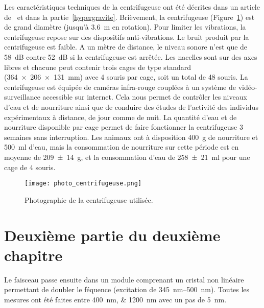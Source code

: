 			Les caractéristiques techniques de la centrifugeuse ont été décrites dans un article de~\cite{jamon_ground-based_2008} et dans la partie~\ref{hypergravite}. Brièvement, la centrifugeuse (Figure~\ref{photo_centrifugeuse}) est de grand diamètre (jusqu'à \SI{3.6}{\m} en rotation). Pour limiter les vibrations, la centrifugeuse repose sur des dispositifs anti-vibrations. Le bruit produit par la centrifugeuse est faible. A un mètre de distance, le niveau sonore n'est que de \SI{58}{\dB} contre \SI{52}{\dB} si la centrifugeuse est arrêtée. Les nacelles sont sur des axes libres et chacune peut contenir trois cages de type standard (\SI{364x206x131}{\mm}) avec 4 souris par cage, soit un total de 48 souris. La centrifugeuse est équipée de caméras infra-rouge couplées à un système de vidéo-surveillance accessible sur internet. Cela nous permet de contrôler les niveaux d'eau et de nourriture ainsi que de conduire des études de l'activité des individus expérimentaux à distance, de jour comme de nuit. La quantité d'eau et de nourriture disponible par cage permet de faire fonctionner la centrifugeuse 3 semaines sans interruption. Les animaux ont à disposition \SI{400}{\g} de nourriture et \SI{500}{\ml} d'eau, mais la consommation de nourriture sur cette période est en moyenne de \SI{209(14)}{\g}, et la consommation d'eau de \SI{258(21)}{\ml} pour une cage de 4 souris.

			\begin{figure}[h!tbp]
				\vspace{0.5cm}
				\setcapindent{2em}
				\centering
				\texttt{[image: photo\_centrifugeuse.png]}
				\caption[Photographie de la centrifugeuse]{Photographie de la centrifugeuse utilisée.}
				\label{photo_centrifugeuse}
			\end{figure}

			\lipsum[2]

\section{Deuxième partie du deuxième chapitre}

	Le faisceau passe ensuite dans un module comprenant un cristal non linéaire permettant de doubler le féquence (excitation de \SIrange{345}{500}{\nano\meter}). Toutes les mesures ont été faites entre \SIlist{400;1200}{\nano\meter} avec un pas de \SI{5}{\nano\meter}.
	
	\lipsum[3]

